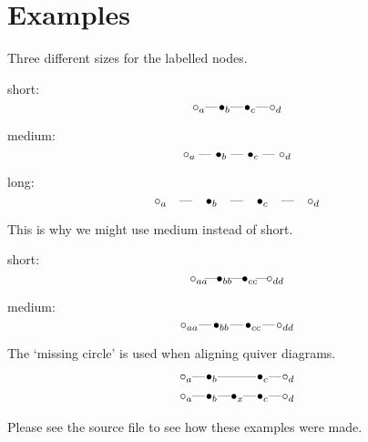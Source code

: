 \documentclass{amsart}
\newcommand{\qlen}{1em}
\newcommand{\Qlen}{1.5em}
\newcommand{\QQlen}{3em}
\newcommand{\qem}{\makebox[\qlen]{---}}
\newcommand{\qno}{\makebox[\qlen]{---}}
\newcommand{\qon}[1]{\makebox[\qlen]{$_{\phantom{}}\bullet_{#1}$}}
\newcommand{\qoff}[1]{\makebox[\qlen]{$_{\phantom{}}\circ_{#1}$}}
\newcommand{\Qon}[1]{\makebox[\Qlen]{$_{\phantom{}}\bullet_{#1}$}}
\newcommand{\Qoff}[1]{\makebox[\Qlen]{$_{\phantom{}}\circ_{#1}$}}
\newcommand{\QQon}[1]{\makebox[\QQlen]{$_{\phantom{}}\bullet_{#1}$}}
\newcommand{\QQoff}[1]{\makebox[\QQlen]{$_{\phantom{}}\circ_{#1}$}}
\begin{document}

\section*{Examples}

\bigskip
\noindent
Three different sizes for the labelled nodes.

short:
\[
\qoff{a} \qem \qon{b} \qem \qon{c} \qem \qoff{d}
\]

medium:
\[
\Qoff{a} \qem \Qon{b} \qem \Qon{c} \qem \Qoff{d}
\]

long:
\[
\QQoff{a} \qem \QQon{b} \qem \QQon{c} \qem \QQoff{d}
\]

\bigskip
\noindent
This is why we might use medium instead of short.

\medskip
short:
\[
\qoff{aa} \qem \qon{bb} \qem \qon{cc} \qem \qoff{dd}
\]

medium:
\[
\Qoff{aa} \qem \Qon{bb} \qem \Qon{cc} \qem \Qoff{dd}
\]

\bigskip
\noindent
The `missing circle' is used when aligning quiver diagrams.
%
\begin{align*}
&
\qoff{a} \qem \qon{b} \qem \qno \qem \qon{c} \qem \qoff{d}
\\
&
\qoff{a} \qem \qon{b} \qem \qon{x} \qem \qon{c} \qem \qoff{d}
\end{align*}

\bigskip
\bigskip
\noindent
Please see the source file to see how these examples were made.

\end{document}
